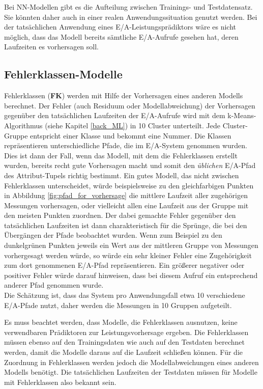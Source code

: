 \documentclass[
	12pt,
	a4paper,
	BCOR10mm,
	DIV14,
	listof=totoc,
	bibliography=totoc,
	headsepline
]{scrreprt}
\begin{document}
Bei NN-Modellen gibt es die Aufteilung zwischen Trainings- und Testdatensatz.
Sie könnten daher auch in einer realen Anwendungssituation genutzt werden. 
Bei der tatsächlichen Anwendung eines E/A-Leistungsprädiktors wäre es nicht möglich, dass das Modell bereits sämtliche E/A-Aufrufe gesehen hat, deren Laufzeiten es vorhersagen soll.

\subsection{Fehlerklassen-Modelle}
\label{fk-modelle}
Fehlerklassen (\textbf{FK}) werden mit Hilfe der Vorhersagen eines anderen Modells berechnet. Der Fehler (auch Residuum oder Modellabweichung) der Vorhersagen gegenüber den tatsächlichen Laufzeiten der E/A-Aufrufe wird mit dem k-Means-Algorithmus (siehe Kapitel \ref{back_ML}) in 10 Cluster unterteilt.
Jede Cluster-Gruppe entspricht einer Klasse und bekommt eine Nummer. 
Die Klassen repräsentieren unterschiedliche Pfade, die im E/A-System genommen wurden. Dies ist dann der Fall, wenn das Modell, mit dem die Fehlerklassen erstellt wurden, bereits recht gute Vorhersagen macht und somit den \textit{üblichen} E/A-Pfad des Attribut-Tupels richtig bestimmt. 
Ein gutes Modell, das nicht zwischen Fehlerklassen unterscheidet, würde beispielsweise zu den gleichfarbigen Punkten in Abbildung \ref{fig:pfad_for_vorhersage} die mittlere Laufzeit aller zugehörigen Messungen vorhersagen, oder vielleicht allen eine Laufzeit aus der Gruppe mit den meisten Punkten zuordnen. 
Der dabei gemachte Fehler gegenüber den tatsächlichen Laufzeiten ist dann charakteristisch für die Sprünge, die bei den Übergängen der Pfade beobachtet wurden.
Wenn zum Beispiel zu den dunkelgrünen Punkten jeweils ein Wert aus der mittleren Gruppe von Messungen vorhergesagt werden würde, so würde ein sehr kleiner Fehler eine Zugehörigkeit zum dort genommenen E/A-Pfad repräsentieren.
Ein größerer negativer oder positiver Fehler würde darauf hinweisen, dass bei diesem Aufruf ein entsprechend anderer Pfad genommen wurde.\\
Die Schätzung ist, dass das System pro Anwendungsfall etwa 10 verschiedene E/A-Pfade nutzt, daher werden die Messungen in 10 Gruppen aufgeteilt.\medskip

Es muss beachtet werden, dass Modelle, die Fehlerklassen ausnutzen, keine verwendbaren Prädiktoren zur Leistungsvorhersage ergeben.
Die Fehlerklassen müssen ebenso auf den Trainingsdaten wie auch auf den Testdaten berechnet werden, damit die Modelle daraus auf die Laufzeit schließen können.
Für die Zuordnung in Fehlerklassen werden jedoch die Modellabweichungen eines anderen Modells benötigt. Die tatsächlichen Laufzeiten der Testdaten müssen für Modelle mit Fehlerklassen also bekannt sein.\medskip
\end{document}
